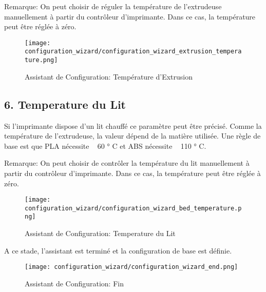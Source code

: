 Remarque: On peut choisir de r\'eguler la temp\'erature de l'extrudeuse manuellement \`a partir du contr\^oleur d'imprimante. Dans ce cas, la temp\'erature peut \^etre r\'egl\'ee \`a z\'ero.

\begin{figure}[H]
\centering
\texttt{[image: configuration\_wizard/configuration\_wizard\_extrusion\_temperature.png]}
\caption{Assistant de Configuration: Temp\'erature d'Extrusion}
\label{fig:configuration_wizard_extrusion_temperature}
\end{figure}

\newpage
\subsection{6. Temperature du Lit}
\label{sub:6_bed_temperature}
Si l'imprimante dispose d'un lit chauff\'e ce param\`etre peut \^etre pr\'ecis\'e. Comme la temp\'erature de l'extrudeuse, la valeur d\'epend de la mati\`ere utilis\'ee. Une r\`egle de base est que PLA n\'ecessite ~ 60 ° C et ABS n\'ecessite ~ 110 ° C.

Remarque: On peut choisir de contr\^oler la temp\'erature du lit manuellement \`a partir du contr\^oleur d'imprimante. Dans ce cas, la temp\'erature peut \^etre r\'egl\'ee \`a z\'ero.

\begin{figure}[H]
\centering
\texttt{[image: configuration\_wizard/configuration\_wizard\_bed\_temperature.png]}
\caption{Assistant de Configuration: Temperature du Lit}
\label{fig:configuration_wizard_bed_temperature}
\end{figure}

\newpage

A ce stade, l'assistant est termin\'e et la configuration de base est d\'efinie.

\begin{figure}[H]
\centering
\texttt{[image: configuration\_wizard/configuration\_wizard\_end.png]}
\caption{Assistant de Configuration: Fin}
\label{fig:configuration_wizard_end}
\end{figure}

